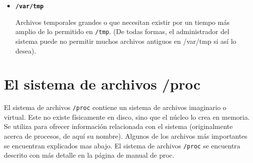 \documentclass[12pt]{article}
\begin{document}
\begin{itemize}
	\item 
        
	\textbf{\texttt{/var/tmp}} 
        
	 Archivos temporales grandes o que necesitan existir por
	un tiempo más amplio de lo permitido en \texttt{/tmp}.  (De
	todas formas, el administrador del sistema puede no permitir muchos
	archivos antiguos en /var/tmp si así lo desea).  
	  \end{itemize}  


\section{ El sistema de archivos /proc}

El sistema de archivos \texttt{/proc} contiene un sistema de
archivos imaginario o virtual. Este no existe físicamente en disco, sino que el
núcleo lo crea en memoria. Se utiliza para ofrecer información relacionada con
el sistema (originalmente acerca de procesos, de aquí su nombre). Algunos de los
archivos más importantes se encuentran explicados mas abajo. El sistema de
archivos \texttt{/proc} se encuentra descrito con más detalle en la
página de manual de proc.
\end{document}
